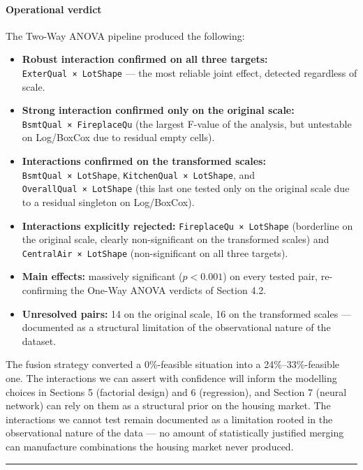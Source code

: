 \paragraph{Operational verdict}\label{operational-verdict}

The Two-Way ANOVA pipeline produced the following:

\begin{itemize}
\tightlist
\item
  \textbf{Robust interaction confirmed on all three targets:}
  \texttt{ExterQual\ ×\ LotShape} --- the most reliable joint effect,
  detected regardless of scale.
\item
  \textbf{Strong interaction confirmed only on the original scale:}
  \texttt{BsmtQual\ ×\ FireplaceQu} (the largest F-value of the
  analysis, but untestable on Log/BoxCox due to residual empty cells).
\item
  \textbf{Interactions confirmed on the transformed scales:}
  \texttt{BsmtQual\ ×\ LotShape}, \texttt{KitchenQual\ ×\ LotShape}, and
  \texttt{OverallQual\ ×\ LotShape} (this last one tested only on the
  original scale due to a residual singleton on Log/BoxCox).
\item
  \textbf{Interactions explicitly rejected:}
  \texttt{FireplaceQu\ ×\ LotShape} (borderline on the original scale,
  clearly non-significant on the transformed scales) and
  \texttt{CentralAir\ ×\ LotShape} (non-significant on all three
  targets).
\item
  \textbf{Main effects:} massively significant (\(p < 0.001\)) on every
  tested pair, re-confirming the One-Way ANOVA verdicts of Section 4.2.
\item
  \textbf{Unresolved pairs:} 14 on the original scale, 16 on the
  transformed scales --- documented as a structural limitation of the
  observational nature of the dataset.
\end{itemize}

The fusion strategy converted a 0\%-feasible situation into a
24\%--33\%-feasible one. The interactions we can assert with confidence
will inform the modelling choices in Sections 5 (factorial design) and 6
(regression), and Section 7 (neural network) can rely on them as a
structural prior on the housing market. The interactions we cannot test
remain documented as a limitation rooted in the observational nature of
the data --- no amount of statistically justified merging can
manufacture combinations the housing market never produced.

\begin{center}\rule{0.5\linewidth}{0.5pt}\end{center}

